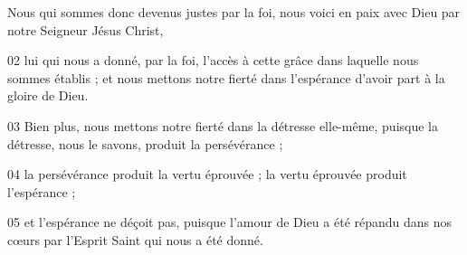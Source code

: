 Nous qui sommes donc devenus justes par la foi, nous voici en paix avec Dieu par notre Seigneur Jésus Christ,

02 lui qui nous a donné, par la foi, l’accès à cette grâce dans laquelle nous sommes établis ; et nous mettons notre fierté dans l’espérance d’avoir part à la gloire de Dieu.

03 Bien plus, nous mettons notre fierté dans la détresse elle-même, puisque la détresse, nous le savons, produit la persévérance ;

04 la persévérance produit la vertu éprouvée ; la vertu éprouvée produit l’espérance ;

05 et l’espérance ne déçoit pas, puisque l’amour de Dieu a été répandu dans nos cœurs par l’Esprit Saint qui nous a été donné.
